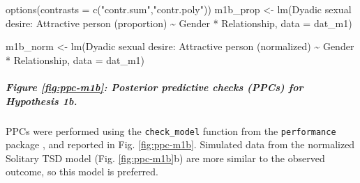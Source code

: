 \documentclass[
  bookmarksnumbered]{article}
\newenvironment{Shaded}{\begin{snugshade}}{\end{snugshade}}
\newcommand{\AttributeTok}[1]{\textcolor[rgb]{0.80,0.80,0.80}{#1}}
\newcommand{\FunctionTok}[1]{\textcolor[rgb]{0.94,0.94,0.56}{#1}}
\newcommand{\NormalTok}[1]{\textcolor[rgb]{0.80,0.80,0.80}{#1}}
\newcommand{\OtherTok}[1]{\textcolor[rgb]{0.94,0.94,0.56}{#1}}
\newcommand{\SpecialCharTok}[1]{\textcolor[rgb]{0.86,0.64,0.64}{#1}}
\newcommand{\StringTok}[1]{\textcolor[rgb]{0.80,0.58,0.58}{#1}}
\begin{document}
\begin{Shaded}
\begin{Highlighting}[]
\FunctionTok{options}\NormalTok{(}\AttributeTok{contrasts =} \FunctionTok{c}\NormalTok{(}\StringTok{"contr.sum"}\NormalTok{,}\StringTok{"contr.poly"}\NormalTok{))}
\NormalTok{m1b\_prop }\OtherTok{\textless{}{-}} \FunctionTok{lm}\NormalTok{(}\StringTok{\textasciigrave{}}\AttributeTok{Dyadic sexual desire: Attractive person (proportion)}\StringTok{\textasciigrave{}} \SpecialCharTok{\textasciitilde{}}\NormalTok{ Gender }\SpecialCharTok{*}\NormalTok{ Relationship,}
            \AttributeTok{data =}\NormalTok{ dat\_m1)}

\NormalTok{m1b\_norm }\OtherTok{\textless{}{-}} \FunctionTok{lm}\NormalTok{(}\StringTok{\textasciigrave{}}\AttributeTok{Dyadic sexual desire: Attractive person (normalized)}\StringTok{\textasciigrave{}} \SpecialCharTok{\textasciitilde{}}\NormalTok{ Gender }\SpecialCharTok{*}\NormalTok{ Relationship,}
           \AttributeTok{data =}\NormalTok{ dat\_m1)}
\end{Highlighting}
\end{Shaded}

\subparagraph{Figure \ref{fig:ppc-m1b}: Posterior predictive checks (PPCs) for Hypothesis 1b.}\label{figure-reffigppc-m1b-posterior-predictive-checks-ppcs-for-hypothesis-1b.}

PPCs were performed using the \texttt{check\_model} function from the \texttt{performance} package \autocite{ludecke2021}, and reported in Fig. \ref{fig:ppc-m1b}. Simulated data from the normalized Solitary TSD model (Fig. \ref{fig:ppc-m1b}b) are more similar to the observed outcome, so this model is preferred.
\end{document}
